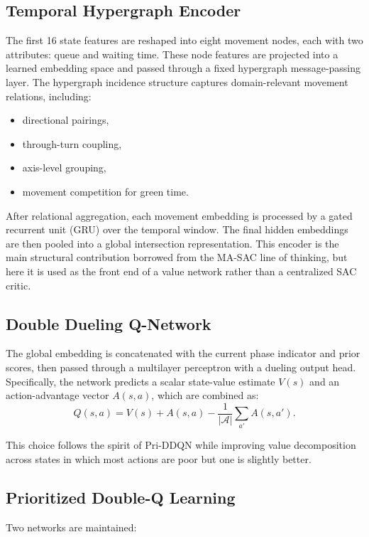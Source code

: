 \documentclass[conference]{IEEEtran}
\begin{document}
\subsection{Temporal Hypergraph Encoder}
The first 16 state features are reshaped into eight movement nodes,
each with two attributes: queue and waiting time. These node features
are projected into a learned embedding space and passed through a
fixed hypergraph message-passing layer. The hypergraph incidence
structure captures domain-relevant movement relations, including:

\begin{itemize}
\item directional pairings,
\item through-turn coupling,
\item axis-level grouping,
\item movement competition for green time.
\end{itemize}

After relational aggregation, each movement embedding is processed by
a gated recurrent unit (GRU) over the temporal window. The final
hidden embeddings are then pooled into a global intersection
representation. This encoder is the main structural contribution
borrowed from the MA-SAC line of thinking, but here it is used as the
front end of a value network rather than a centralized SAC critic.

\subsection{Double Dueling Q-Network}
The global embedding is concatenated with the current phase indicator
and prior scores, then passed through a multilayer perceptron with a
dueling output head. Specifically, the network predicts a scalar
state-value estimate $V(s)$ and an action-advantage vector
$A(s,a)$, which are combined as:
\begin{equation}
Q(s,a) = V(s) + A(s,a) - \frac{1}{|\mathcal{A}|}\sum_{a'} A(s,a').
\end{equation}

This choice follows the spirit of Pri-DDQN while improving value
decomposition across states in which most actions are poor but one is
slightly better.

\subsection{Prioritized Double-Q Learning}
Two networks are maintained:
\end{document}
